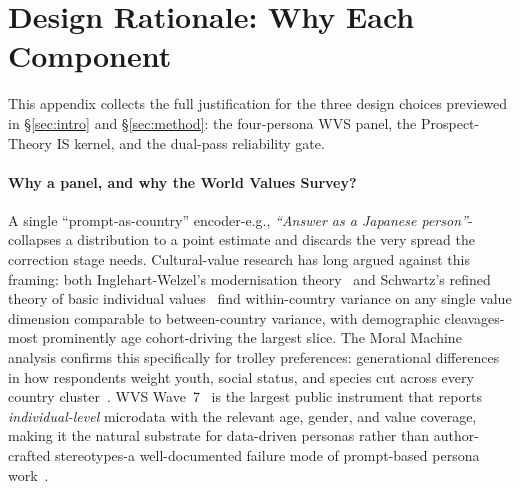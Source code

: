 \documentclass{article}
\begin{document}



\newpage
\appendix
\setcounter{section}{0}
\renewcommand{\thesection}{A\arabic{section}}

\section{Design Rationale: Why Each Component}
\label{app:design_rationale}

This appendix collects the full justification for the three design choices
previewed in \S\ref{sec:intro} and \S\ref{sec:method}: the four-persona WVS
panel, the Prospect-Theory IS kernel, and the dual-pass reliability gate.

\paragraph{Why a panel, and why the World Values Survey?}
A single ``prompt-as-country'' encoder-e.g., \emph{``Answer as a Japanese
person''}-collapses a distribution to a point estimate and discards the very
spread the correction stage needs. Cultural-value research has long argued
against this framing: both Inglehart-Welzel's modernisation
theory~\citep{inglehart2005modernization} and Schwartz's refined theory of
basic individual values~\citep{schwartz2012refining} find within-country
variance on any single value dimension comparable to between-country variance,
with demographic cleavages-most prominently age cohort-driving the largest
slice. The Moral Machine analysis confirms this specifically for trolley
preferences: generational differences in how respondents weight youth, social
status, and species cut across every country cluster~\citep{awad2018moral,
kleiman2017learning}. WVS Wave~7~\citep{haerpfer2022wvs} is the largest public
instrument that reports \emph{individual-level} microdata with the relevant
age, gender, and value coverage, making it the natural substrate for
data-driven personas rather than author-crafted stereotypes-a well-documented
failure mode of prompt-based persona work~\citep{deshpande2023toxicity}.
\end{document}
